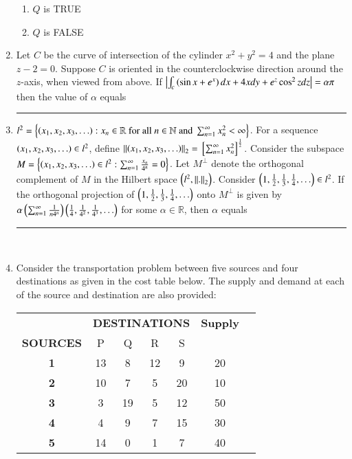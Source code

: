 \documentclass[journal]{IEEEtran}
\begin{document}
\begin{enumerate}
{\begin{multicols}{4}
\begin{enumerate}
\item $Q$ is TRUE
\item $Q$ is FALSE
\end{enumerate}
\end{multicols}}
\item{
Let $C$ be the curve of intersection of the cylinder $x^2+y^2=4$ and the plane $z-2=0$. Suppose $C$ is oriented in the counterclockwise direction around the $z$-axis, when viewed from above. If $\left\vert\int_c\left(\sin x+e^x\right)dx+4xdy+e^z\cos^2zdz\right\vert=\alpha\pi$ then the value of $\alpha$ equals \rule{2cm}{0.15mm}
}
\item{
$l^2 = \left\{\left(x_1, x_2, x_3, \ldots\right) : x_n \in \mathbb{R} \text{ for all } n \in \mathbb{N} \text{ and } \sum_{n=1}^{\infty} x_n^2 < \infty\right\}$.
For a sequence $\left(x_1, x_2, x_3, \ldots\right) \in l^2$, define $\left\lVert\left(x_1, x_2, x_3, \ldots\right)\right\rVert_2 = {}\left[\sum_{n=1}^{\infty} x_n^2\right]^{\frac{1}{2}}$.
Consider the subspace $ M = \left\{\left(x_1, x_2, x_3, \ldots\right) \in l^2 : \sum_{n=1}^{\infty} \frac{x_n}{4^n} = 0\right\} $. Let $M^\perp$ denote the orthogonal complement of $M$ in the Hilbert space $\left(l^2,\left\lVert.\right\rVert_2\right)$. Consider $\left(1,\frac{1}{2},\frac{1}{3},\frac{1}{4},\hdots\right)\in l^2$. If the orthogonal projection of $\left(1,\frac{1}{2},\frac{1}{3},\frac{1}{4},\hdots\right)$ onto $M^\perp$ is given by $\alpha\left(\sum_{n=1}^{\infty}\frac{1}{n4^n}\right)\left(\frac{1}{4},\frac{1}{	4^2},\frac{1}{4^3},\hdots\right)$ for some $\alpha\in\mathbb{R}$, then $\alpha$ equals \rule{2cm}{0.15mm}\\
}
\item{
Consider the transportation problem between five sources and four destinations as given in the cost table below. The supply and demand at each of the source and destination are also provided:
\begin{table}[H]
    \centering
    \begin{tabular}{|c|c|c|c|c|c|c|}
        \hline
        & \multicolumn{4}{c|}{\textbf{DESTINATIONS}} & \textbf{Supply} \\ \cline{2-5}
        \textbf{SOURCES} & P & Q & R & S & \\ \hline
        \textbf{1} & 13 & 8 & 12 & 9 & 20 \\ \hline
        \textbf{2} & 10 & 7 & 5 & 20 & 10 \\ \hline
        \textbf{3} & 3 & 19 & 5 & 12 & 50 \\ \hline
        \textbf{4} & 4 & 9 & 7 & 15 & 30 \\ \hline
        \textbf{5} & 14 & 0 & 1 & 7 & 40 \\ \hline

\end{tabular}
\end{table}}
\end{enumerate}
\end{document}
